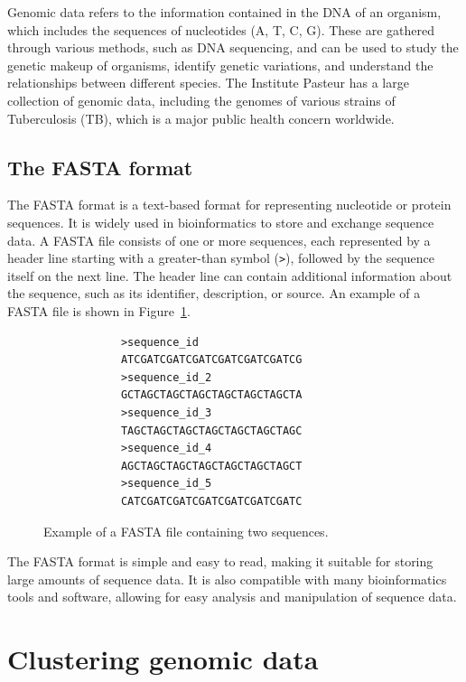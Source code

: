 Genomic data refers to the information contained in the DNA of an organism, which includes the sequences of nucleotides (A, T, C, G).
These are gathered through various methods, such as DNA sequencing, and can be used to study the genetic makeup of organisms,
identify genetic variations, and understand the relationships between different species. The Institute Pasteur has a large collection
of genomic data, including the genomes of various strains of Tuberculosis (TB), which is a major public health concern worldwide.

\section{The FASTA format}
\label{sec:fasta_format}

The FASTA format is a text-based format for representing nucleotide or protein sequences. It is widely used in bioinformatics
to store and exchange sequence data. A FASTA file consists of one or more sequences, each represented by a header line starting with
a greater-than symbol (\texttt{>}), followed by the sequence itself on the next line. The header line can contain additional
information about the sequence, such as its identifier, description, or source. An example of a FASTA file is shown in
Figure~\ref{fig:fasta_example}.

\begin{center}
	\begin{figure}[H]
		\begin{BVerbatim}
			>sequence_id
			ATCGATCGATCGATCGATCGATCGATCG
			>sequence_id_2
			GCTAGCTAGCTAGCTAGCTAGCTAGCTA
			>sequence_id_3
			TAGCTAGCTAGCTAGCTAGCTAGCTAGC
			>sequence_id_4
			AGCTAGCTAGCTAGCTAGCTAGCTAGCT
			>sequence_id_5
			CATCGATCGATCGATCGATCGATCGATC
		\end{BVerbatim}
		\caption{Example of a FASTA file containing two sequences.}
		\label{fig:fasta_example}
	\end{figure}
\end{center}

The FASTA format is simple and easy to read, making it suitable for storing large amounts of sequence data. It is also compatible
with many bioinformatics tools and software, allowing for easy analysis and manipulation of sequence data.

\chapter{Clustering genomic data}
\label{chap:clustering_genomic_data}

